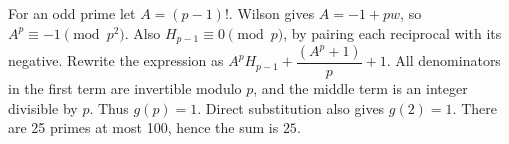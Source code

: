For an odd prime let $A=(p-1)!$. Wilson gives $A=-1+pw$, so $A^p\equiv-1\pmod{p^2}$. Also $H_{p-1}\equiv0\pmod p$, by pairing each reciprocal with its negative. Rewrite the expression as $A^pH_{p-1}+\dfrac{(A^p+1)}{p}+1$. All denominators in the first term are invertible modulo $p$, and the middle term is an integer divisible by $p$. Thus $g(p)=1$. Direct substitution also gives $g(2)=1$. There are 25 primes at most 100, hence the sum is $\boxed{25}$.
